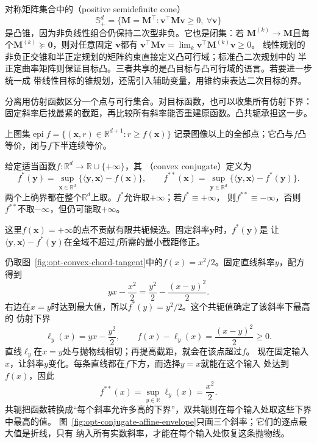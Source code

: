 对称矩阵集合中的（positive semidefinite cone）
\[
  \mathbb{S}_+^d=\{\bm{M}=\bm{M}^{\top}:
  \bm{v}^{\top}\bm{M}\bm{v}\geq0,\ \forall\bm{v}\}
\]
是凸锥，因为非负线性组合仍保持二次型非负。它也是闭集：若
$\bm{M}^{(k)}\to\bm{M}$且每个$\bm{M}^{(k)}\succeq\bm{0}$，则对任意固定
$\bm{v}$都有
$\bm{v}^{\top}\bm{M}\bm{v}
=\lim_k\bm{v}^{\top}\bm{M}^{(k)}\bm{v}\geq0$。
线性规划的非负正交锥和半正定规划的矩阵约束直接定义凸可行域；标准凸二次规划中的
半正定曲率矩阵则保证目标凸。三者共享的是凸目标与凸可行域的语言。若要进一步统一成
带线性目标的锥规划，还需引入辅助变量，用锥约束表达二次目标的界。

分离用仿射函数区分一个点与可行集合。对目标函数，也可以收集所有仿射下界：
固定斜率后找最紧的截距，再比较所有斜率能否重建原函数。凸共轭承担这一步。

上图集$\operatorname{epi}f=\{(\bm x,r)\in\mathbb R^{d+1}:r\geq f(\bm x)\}$
记录图像以上的全部点；它凸与$f$凸等价，闭与$f$下半连续等价。
\begin{definition}[凸共轭与双共轭]
\label{def:opt-conjugate}
给定适当函数$f:\mathbb R^d\to\mathbb R\cup\{+\infty\}$，其
（convex conjugate）定义为
\begin{equation}
 f^*(\bm y)=\sup_{\bm x\in\mathbb R^d}
            \{\langle\bm y,\bm x\rangle-f(\bm x)\},
 \qquad
 f^{**}(\bm x)=\sup_{\bm y\in\mathbb R^d}
            \{\langle\bm y,\bm x\rangle-f^*(\bm y)\}.
 \label{eq:opt-conjugate-biconjugate}
\end{equation}
两个上确界都在整个$\mathbb R^d$上取。$f^*$允许取$+\infty$；若$f^*\equiv+\infty$，
则$f^{**}\equiv-\infty$，否则$f^{**}$不取$-\infty$，但仍可能取$+\infty$。
\end{definition}
这里$f(\bm x)=+\infty$的点不贡献有限共轭候选。固定斜率$\bm y$时，$f^*(\bm y)$是
让$\langle\bm y,\bm x\rangle-f^*(\bm y)$在全域不超过$f$所需的最小截距修正。

\begin{example}[由斜率重建二次函数]
\label{ex:opt-quadratic-conjugate-envelope}
仍取图~\ref{fig:opt-convex-chord-tangent}中的$f(x)=x^2/2$。固定直线斜率$y$，配方得到
\[
 yx-\frac{x^2}{2}
 =\frac{y^2}{2}-\frac{(x-y)^2}{2}.
\]
右边在$x=y$时达到最大值，所以$f^*(y)=y^2/2$。这个共轭值确定了该斜率下最高的
仿射下界
\begin{equation}
 \ell_y(x)=yx-\frac{y^2}{2},\qquad
 f(x)-\ell_y(x)=\frac{(x-y)^2}{2}\geq0.
 \label{eq:opt-quadratic-affine-minorant}
\end{equation}
直线$\ell_y$在$x=y$处与抛物线相切；再提高截距，就会在该点超过$f$。
现在固定输入$x$，让斜率$y$变化。每条直线都在$f$下方，而选择$y=x$就能在这个输入
处达到$f(x)$，因此
\[
 f^{**}(x)=\sup_{y\in\mathbb R}\ell_y(x)=\frac{x^2}{2}.
\]
共轭把函数转换成“每个斜率允许多高的下界”，双共轭则在每个输入处取这些下界中最高的值。
图~\ref{fig:opt-conjugate-affine-envelope}只画三个斜率；它们的逐点最大值是折线，只有
纳入所有实数斜率，才能在每个输入处恢复这条抛物线。
\end{example}

